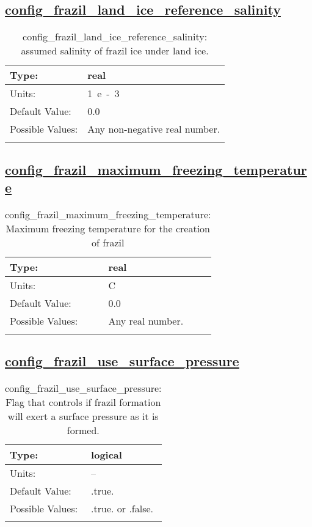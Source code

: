 \subsection[config\_frazil\_land\_ice\_reference\_salinity]{\hyperref[sec:nm_tab_frazil_ice]{config\_frazil\_land\_ice\_reference\_salinity}}
\label{subsec:nm_sec_config_frazil_land_ice_reference_salinity}
\begin{center}
\begin{longtable}{| p{2.0in} || p{4.0in} |}
    \hline
    Type: & real \\
    \hline
    Units: & \si{1.e-3} \\
    \hline
    Default Value: & 0.0 \\
    \hline
    Possible Values: & Any non-negative real number. \\
    \hline
    \caption{config\_frazil\_land\_ice\_reference\_salinity: assumed salinity of frazil ice under land ice.}
\end{longtable}
\end{center}
\subsection[config\_frazil\_maximum\_freezing\_temperature]{\hyperref[sec:nm_tab_frazil_ice]{config\_frazil\_maximum\_freezing\_temperature}}
\label{subsec:nm_sec_config_frazil_maximum_freezing_temperature}
\begin{center}
\begin{longtable}{| p{2.0in} || p{4.0in} |}
    \hline
    Type: & real \\
    \hline
    Units: & \si{C} \\
    \hline
    Default Value: & 0.0 \\
    \hline
    Possible Values: & Any real number. \\
    \hline
    \caption{config\_frazil\_maximum\_freezing\_temperature: Maximum freezing temperature for the creation of frazil}
\end{longtable}
\end{center}
\subsection[config\_frazil\_use\_surface\_pressure]{\hyperref[sec:nm_tab_frazil_ice]{config\_frazil\_use\_surface\_pressure}}
\label{subsec:nm_sec_config_frazil_use_surface_pressure}
\begin{center}
\begin{longtable}{| p{2.0in} || p{4.0in} |}
    \hline
    Type: & logical \\
    \hline
    Units: & -- \\
    \hline
    Default Value: & .true. \\
    \hline
    Possible Values: & .true. or .false. \\
    \hline
    \caption{config\_frazil\_use\_surface\_pressure: Flag that controls if frazil formation will exert a surface pressure as it is formed.}
\end{longtable}
\end{center}
